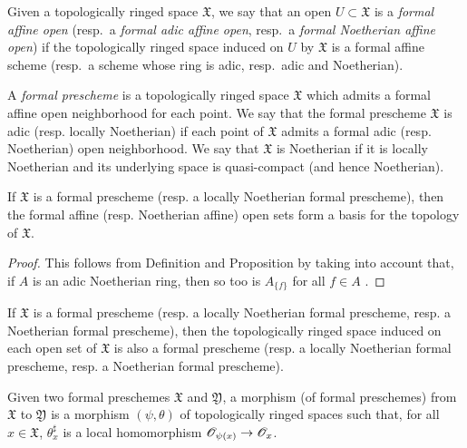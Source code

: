 \begin{env}[10.4.1]
\label{1.10.4.1}
Given a topologically ringed space $\mathfrak{X}$, we say that an open $U\subset\mathfrak{X}$ is a \emph{formal affine open} (resp.~a \emph{formal adic affine open}, resp.~a \emph{formal Noetherian affine open}) if the topologically ringed space induced on $U$ by $\mathfrak{X}$ is a formal affine scheme (resp.~a scheme whose ring is adic, resp.~adic and Noetherian).
\end{env}

\begin{definition}[10.4.2]
\label{1.10.4.2}
A \emph{formal prescheme} is a topologically ringed space $\mathfrak{X}$ which admits a formal affine open neighborhood for each point.
We say that the formal prescheme $\mathfrak{X}$ is adic (resp. locally Noetherian) if each point of $\mathfrak{X}$ admits a formal adic (resp. Noetherian) open neighborhood.
We say that $\mathfrak{X}$ is Noetherian if it is locally Noetherian and its underlying space is quasi-compact (and hence Noetherian).
\end{definition}

\begin{proposition}[10.4.3]
\label{1.10.4.3}
If $\mathfrak{X}$ is a formal prescheme (resp. a locally Noetherian formal prescheme), then the formal affine (resp. Noetherian affine) open sets form a basis for the topology of $\mathfrak{X}$.
\end{proposition}

\begin{proof}
\label{proof-1.10.4.3}
This follows from Definition  and Proposition  by taking into account that, if $A$ is an adic Noetherian ring, then so too is $A_{\{f\}}$ for all $f\in A$ .
\end{proof}

\begin{corollary}[10.4.4]
\label{1.10.4.4}
If $\mathfrak{X}$ is a formal prescheme (resp. a locally Noetherian formal prescheme, resp. a Noetherian formal prescheme), then the topologically ringed space induced on each open set of $\mathfrak{X}$ is also a formal prescheme (resp. a locally Noetherian formal prescheme, resp. a Noetherian formal prescheme).
\end{corollary}

\begin{definition}[10.4.5]
\label{1.10.4.5}
Given two formal preschemes $\mathfrak{X}$ and $\mathfrak{Y}$, a morphism (of formal preschemes) from $\mathfrak{X}$ to $\mathfrak{Y}$ is a morphism $(\psi,\theta)$ of topologically ringed spaces such that, for all $x\in\mathfrak{X}$, $\theta_x^\sharp$ is a local homomorphism $\sh{O}_{\psi(x)}\to\sh{O}_x$.
\end{definition}

